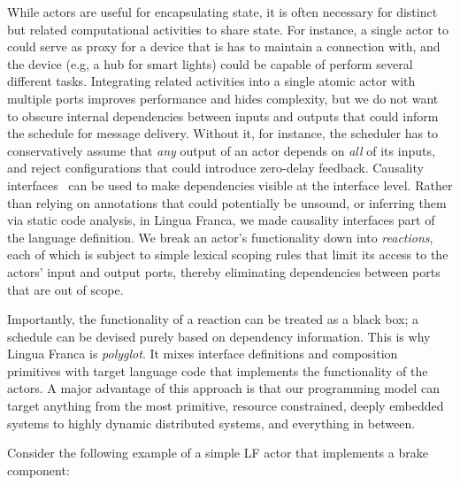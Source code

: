 \documentclass[sigconf]{acmart}
\begin{document}
While actors are useful for encapsulating state, it is often necessary for distinct but related computational activities to share state. For instance, a single actor to could serve as proxy for a device that is has to maintain a connection with, and the device (e.g, a hub for smart lights) could be capable of perform several different tasks.
Integrating related activities into a single atomic actor with multiple ports improves performance and hides complexity, but we do not want to obscure internal dependencies between inputs and outputs that could inform the schedule for message delivery. Without it, for instance, the scheduler has to conservatively assume that \emph{any} output of an actor depends on \emph{all} of its inputs, and reject configurations that could introduce zero-delay feedback. Causality interfaces~\cite{ZhouLee:08:CausalityInterfaces} can be used to make dependencies visible at the interface level. Rather than relying on annotations that could potentially be unsound, or inferring them via static code analysis, in Lingua Franca, we made causality interfaces part of the language definition. We break an actor's functionality down into \emph{reactions}, each of which is subject to simple lexical scoping rules that limit its access to the actors' input and output ports, thereby eliminating dependencies between ports that are out of scope. 

Importantly, the functionality of a reaction can be treated as a black box; a schedule can be devised purely based on dependency information. This is why Lingua Franca is \emph{polyglot}. It mixes interface definitions and composition primitives with target language code that implements the functionality of the actors. A major advantage of this approach is that our programming model can target anything from the most primitive, resource constrained, deeply embedded systems to highly dynamic distributed systems, and everything in between.

Consider the following example of a simple LF actor that implements a brake component:

\end{document}
